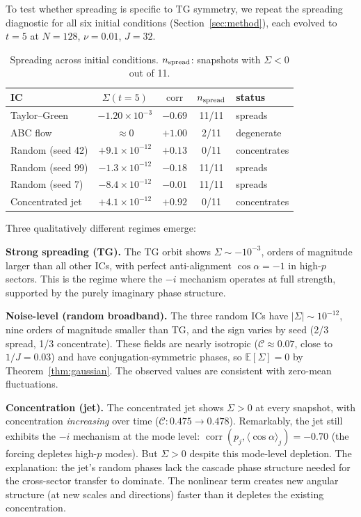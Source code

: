 \documentclass[11pt]{article}
\theoremstyle{definition}
\newcommand{\E}{\mathbb{E}}
\newcommand{\cC}{\mathcal{C}}
\DeclareMathOperator{\corr}{corr}
\begin{document}
To test whether spreading is specific to TG symmetry,
we repeat the spreading diagnostic for all six initial
conditions (Section~\ref{sec:method}), each evolved to
$t=5$ at $N=128$, $\nu=0.01$, $J=32$.

\begin{table}[h]
\centering
\caption{Spreading across initial conditions.
$n_{\rm spread}$: snapshots with $\Sigma<0$ out of 11.}
\label{tab:multi-ic}
\begin{tabular}{@{}lcccl@{}}
\toprule
IC & $\Sigma(t\!=\!5)$ & $\corr$ & $n_{\rm spread}$
  & status \\
\midrule
Taylor--Green    & $-1.20\times 10^{-3}$ & $-0.69$ & 11/11
  & spreads \\
ABC flow         & $\approx 0$     & $+1.00$ & 2/11
  & degenerate \\
Random (seed 42) & $+9.1\times 10^{-12}$ & $+0.13$ & 0/11
  & concentrates \\
Random (seed 99) & $-1.3\times 10^{-12}$ & $-0.18$ & 11/11
  & spreads \\
Random (seed 7)  & $-8.4\times 10^{-12}$ & $-0.01$ & 11/11
  & spreads \\
Concentrated jet & $+4.1\times 10^{-12}$ & $+0.92$ & 0/11
  & concentrates \\
\bottomrule
\end{tabular}
\end{table}

Three qualitatively different regimes emerge:

\medskip\noindent\textbf{Strong spreading (TG).}
The TG orbit shows $\Sigma \sim -10^{-3}$, orders of
magnitude larger than all other ICs, with perfect
anti-alignment $\cos\alpha=-1$ in high-$p$ sectors.
This is the regime where the $-i$ mechanism operates
at full strength, supported by the purely imaginary
phase structure.

\medskip\noindent\textbf{Noise-level (random broadband).}
The three random ICs have $|\Sigma|\sim 10^{-12}$,
nine orders of magnitude smaller than TG, and the sign
varies by seed (2/3 spread, 1/3 concentrate).  These
fields are nearly isotropic ($\cC\approx 0.07$, close
to $1/J=0.03$) and have conjugation-symmetric phases,
so $\E[\Sigma]=0$ by Theorem~\ref{thm:gaussian}.
The observed values are consistent with zero-mean
fluctuations.

\medskip\noindent\textbf{Concentration (jet).}
The concentrated jet shows $\Sigma > 0$ at every snapshot,
with concentration \emph{increasing} over time
($\cC: 0.475\to 0.478$).  Remarkably, the jet still
exhibits the $-i$ mechanism at the mode level:
$\corr(p_j,\langle\cos\alpha\rangle_j) = -0.70$
(the forcing depletes high-$p$ modes).  But $\Sigma>0$
despite this mode-level depletion.  The explanation:
the jet's random phases lack the cascade phase structure
needed for the cross-sector transfer to dominate.
The nonlinear term creates new angular structure
(at new scales and directions) faster than it depletes
the existing concentration.
\end{document}
